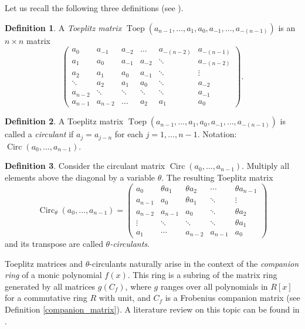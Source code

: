 \documentclass[14pt, dvipsnames]{extarticle}
\theoremstyle{definition}
\theoremstyle{definition}
\newtheorem{defi}{Definition}
\theoremstyle{remark}
\DeclareMathOperator{\Toep}{\mathrm{Toep}}
\DeclareMathOperator{\Circ}{\mathrm{Circ}}
\begin{document}
Let us recall the following three definitions (see \cite{Gantmacher, Babenko}).

\begin{defi}
A {\it Toeplitz matrix} $\Toep(a_{n-1}, \dots, a_1, a_0, a_{-1}, \dots, a_{-(n-1)})$ is an $n\times n$ matrix
\begin{equation*}  
\left(\begin{array}{cccccc}
a_{0} & a_{-1} & a_{-2} & \dots & a_{-(n-2)} & a_{-(n-1)}\\
a_{1} & a_{0} & a_{-1} & a_{-2} & \ddots & a_{-(n-2)}\\
a_{2} & a_{1} & a_{0} & a_{-1} & \ddots & \vdots\\
\ddots & a_{2} & a_{1} & a_{0} & \ddots & a_{-2}\\
a_{n-2} & \ddots & \ddots & \ddots & \ddots & a_{-1}\\
a_{n-1} & a_{n-2} & \dots & a_{2} & a_{1} & a_{0}
\end{array}\right).
\end{equation*}
\end{defi}

\begin{defi}
A Toeplitz matrix $\Toep(a_{n-1}, \dots, a_1, a_0, a_{-1}, \dots, a_{-(n-1)})$ is called a {\it circulant} if $a_j = a_{j - n}$ for each $j = 1, \dots, n - 1$. Notation: $\Circ(a_0, \dots, a_{n-1})$.
\end{defi}

\begin{defi}
Consider the circulant matrix $\Circ(a_0, \dots, a_{n-1})$. Multiply all elements above the diagonal by a variable $\theta$. The resulting Toeplitz matrix
$$\Circ_\theta(a_0, \dots, a_{n-1}) = \left(\begin{array}{ccccc}
a_{0} & \theta a_{1} & \theta a_{2} & \cdots & \theta a_{n-1}\\
a_{n-1} & a_{0} & \theta a_{1} & \ddots & \vdots\\
a_{n-2} & a_{n-1} & a_{0} & \ddots & \theta a_{2}\\
\vdots & \ddots & \ddots & \ddots & \theta a_{1}\\
a_{1} & \cdots & a_{n-2} & a_{n-1} & a_{0}
\end{array}\right)$$
and its transpose are called {\it $\theta$-circulants}.
\end{defi}

Toeplitz matrices and $\theta$-circulants naturally arise in the context of the {\it companion ring} of a monic polynomial $f(x)$. This ring is a subring of the matrix ring generated by all matrices $g(C_f)$, where $g$ ranges over all polynomials in $R[x]$ for a commutative ring $R$ with unit, and $C_f$ is a Frobenius companion matrix (see Definition \ref{companion_matrix}). A literature review on this topic can be found in \cite{Mednykh}.
\end{document}
